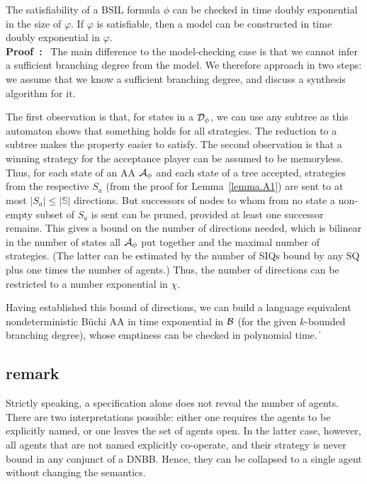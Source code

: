 \documentclass[11pt]{article}
\newcommand{\cala}{{\cal A}}
\newcommand{\calb}{{\cal B}}
\newcommand{\cald}{{\cal D}}
\newcommand{\pf}{\noindent\mbox{\bf Proof : }}
\newcommand{\bbbbs}{{\mathbb S}}
\def\qed{\ifmmode\|\else{\unskip\nobreak\hfil
\penalty50\hskip1em\null\nobreak\hfil$\blacksquare$
\parfillskip=0pt\finalhyphendemerits=0\endgraf}\fi}
\begin{document}
{\theorem\label{thm.sat}
The satisfiability of a BSIL formula $\phi$ can be checked in time doubly exponential in the size of $\varphi$.
If $\varphi$ is satisfiable, then a model can be constructed in time doubly exponential in $\varphi$.
}
\\\pf
The main difference to the model-checking case is that we cannot infer a sufficient branching degree from the model.
We therefore approach in two steps: we assume that we know a sufficient branching degree, and discuss a synthesis algorithm for it.

The first observation is that, for states in a $\cald_\phi$, 
we can use any subtree as this automaton shows that something holds 
for all strategies.   
The reduction to a subtree makes the property easier to satisfy.
The second observation is that a winning strategy 
for the acceptance player 
can be assumed to be memoryless.
Thus, for each state of an AA $\cala_\phi$ and each state 
of a tree accepted, strategies from the respective 
$S_a$ (from the proof for Lemma~\ref{lemma.A1}) 
are sent to at most $|S_a| \leq |\bbbbs|$ directions.
But successors of nodes to whom from no state a non-empty subset 
of $S_a$ is sent can be pruned, provided at least one successor remains.
This gives a bound on the number of directions needed, which is bilinear in the number of states all $\cala_\phi$ put together and the maximal number of strategies.
(The latter can be estimated by the number of SIQs bound by any SQ plus one times the number of agents.)  
Thus, the number of directions can be restricted 
to a number exponential in $\chi$.

Having established this bound of directions, 
we can build a language equivalent nondeterministic B\"uchi AA  
in time exponential in $\calb$ 
(for the given $k$-bounded branching degree), 
whose emptiness can be checked in polynomial time.
\qed




\subsection*{remark}
Strictly speaking, a specification alone does not reveal the number of agents. There are two interpretations possible: either one requires the agents to be explicitly named, or one leaves the set of agents open. In the latter case, however, all agents that are not named explicitly co-operate, and their strategy is never bound in any conjunct of a DNBB. Hence, they can be collapsed to a single agent without changing the semantics.
\end{document}
